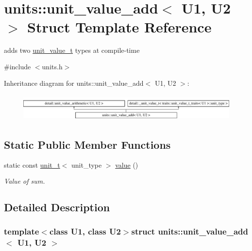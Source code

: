 \hypertarget{structunits_1_1unit__value__add}{}\section{units\+:\+:unit\+\_\+value\+\_\+add$<$ U1, U2 $>$ Struct Template Reference}
\label{structunits_1_1unit__value__add}


adds two \hyperlink{structunits_1_1unit__value__t}{unit\+\_\+value\+\_\+t} types at compile-\/time  




{\ttfamily \#include $<$units.\+h$>$}

Inheritance diagram for units\+:\+:unit\+\_\+value\+\_\+add$<$ U1, U2 $>$\+:\begin{figure}[H]
\begin{center}
\leavevmode
\includegraphics[height=1.450777cm]{structunits_1_1unit__value__add}
\end{center}
\end{figure}
\subsection*{Static Public Member Functions}
\begin{DoxyCompactItemize}
\item 
static const \hyperlink{classunits_1_1unit__t}{unit\+\_\+t}$<$ unit\+\_\+type $>$ \hyperlink{structunits_1_1unit__value__add_a0114743d4d923af293a9d862001b55ec}{value} ()
\begin{DoxyCompactList}\small\item\em Value of sum. \end{DoxyCompactList}\end{DoxyCompactItemize}


\subsection{Detailed Description}
\subsubsection*{template$<$class U1, class U2$>$struct units\+::unit\+\_\+value\+\_\+add$<$ U1, U2 $>$}

